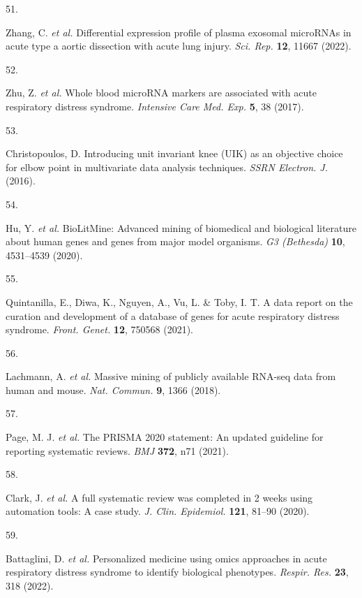 \documentclass[
  11,
  a4paper,
]{article}
\newlength{\cslhangindent}
\newlength{\csllabelwidth}
\newlength{\cslentryspacingunit} %
\newenvironment{CSLReferences}[2] %
 {%
  \setlength{\parindent}{0pt}
  \ifodd #1
  \let\oldpar\par
  \def\par{\hangindent=\cslhangindent\oldpar}
  \fi
  \setlength{\parskip}{#2\cslentryspacingunit}
 }%
 {}
\newcommand{\CSLLeftMargin}[1]{\parbox[t]{\csllabelwidth}{#1}}
\newcommand{\CSLRightInline}[1]{\parbox[t]{\linewidth - \csllabelwidth}{#1}\break}
\begin{document}
\begin{CSLReferences}{0}{0}
\leavevmode{}%
\CSLLeftMargin{51. }%
\CSLRightInline{Zhang, C. \emph{et al.} Differential expression profile
of plasma exosomal {microRNAs} in acute type a aortic dissection with
acute lung injury. \emph{Sci. Rep.} \textbf{12}, 11667 (2022).}

\leavevmode{}%
\CSLLeftMargin{52. }%
\CSLRightInline{Zhu, Z. \emph{et al.} Whole blood {microRNA} markers are
associated with acute respiratory distress syndrome. \emph{Intensive
Care Med. Exp.} \textbf{5}, 38 (2017).}

\leavevmode{}%
\CSLLeftMargin{53. }%
\CSLRightInline{Christopoulos, D. Introducing unit invariant knee
({UIK}) as an objective choice for elbow point in multivariate data
analysis techniques. \emph{SSRN Electron. J.} (2016).}

\leavevmode{}%
\CSLLeftMargin{54. }%
\CSLRightInline{Hu, Y. \emph{et al.} {BioLitMine}: Advanced mining of
biomedical and biological literature about human genes and genes from
major model organisms. \emph{G3 (Bethesda)} \textbf{10}, 4531--4539
(2020).}

\leavevmode{}%
\CSLLeftMargin{55. }%
\CSLRightInline{Quintanilla, E., Diwa, K., Nguyen, A., Vu, L. \& Toby,
I. T. A data report on the curation and development of a database of
genes for acute respiratory distress syndrome. \emph{Front. Genet.}
\textbf{12}, 750568 (2021).}

\leavevmode{}%
\CSLLeftMargin{56. }%
\CSLRightInline{Lachmann, A. \emph{et al.} Massive mining of publicly
available {RNA-seq} data from human and mouse. \emph{Nat. Commun.}
\textbf{9}, 1366 (2018).}

\leavevmode{}%
\CSLLeftMargin{57. }%
\CSLRightInline{Page, M. J. \emph{et al.} The {PRISMA} 2020 statement:
An updated guideline for reporting systematic reviews. \emph{BMJ}
\textbf{372}, n71 (2021).}

\leavevmode{}%
\CSLLeftMargin{58. }%
\CSLRightInline{Clark, J. \emph{et al.} A full systematic review was
completed in 2 weeks using automation tools: A case study. \emph{J.
Clin. Epidemiol.} \textbf{121}, 81--90 (2020).}

\leavevmode{}%
\CSLLeftMargin{59. }%
\CSLRightInline{Battaglini, D. \emph{et al.} Personalized medicine using
omics approaches in acute respiratory distress syndrome to identify
biological phenotypes. \emph{Respir. Res.} \textbf{23}, 318 (2022).}


\end{CSLReferences}
\end{document}
